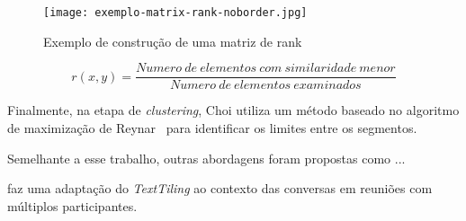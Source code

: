   \begin{figure}[!h]

	\centering
	\texttt{[image: exemplo-matrix-rank-noborder.jpg]}
	\caption{Exemplo de construção de uma matriz de rank}
	\label{fig:exemplomatrixrank}

  \end{figure}




\begin{equation}
r(x,y) = \frac
{Numero\ de\ elementos\ com\ similaridade\ menor}
{Numero\ de\ elementos\ examinados}
\label{equ:ranklocal}
\end{equation}


	
	Finalmente, na etapa de \textit{clustering}, Choi utiliza um método baseado no algoritmo de maximização de Reynar~\cite{reynar} para identificar os limites entre os segmentos.




Semelhante a esse trabalho, outras abordagens foram propostas como ...

\cite{Banerjee200657} faz uma adaptação do \textit{TextTiling} ao contexto das conversas em reuniões com múltiplos participantes.  



